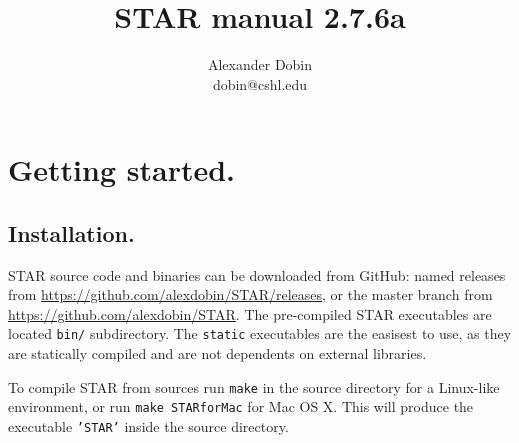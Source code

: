 \documentclass[12pt]{article}
\begin{document}
\hypersetup{
	linkcolor=MidnightBlue
	}


\newcommand{\optn}[1]{\sloppy\textcolor{violet}{\texttt{--#1}}}
\newcommand{\opt}[1]{\sloppy\hyperlink{#1}{\optn{#1}}}
\newcommand{\optv}[1]{\sloppy\texttt{#1}}
\newcommand{\optvr}[1]{\sloppy\textit{\texttt{#1}}}

\newcommand{\code}[1]{\sloppy\texttt{#1}}
	
\newcommand{\codelines}[1]{\begin{adjustwidth}{0.5in}{0in}
	\raggedright\texttt{#1}
	\end{adjustwidth}}

\newcommand{\ofilen}[1]{\sloppy\texttt{#1}}

\newcommand{\sechyperref}[1]{\hyperref[#1]{Section \ref{#1}. \nameref{#1}}}

\title{STAR manual 2.7.6a}
\author{Alexander Dobin\\
dobin@cshl.edu}
\maketitle
\tableofcontents

\newpage

\section{Getting started.}
\subsection{Installation.}

STAR source code and binaries can be downloaded from GitHub: named releases from \url{https://github.com/alexdobin/STAR/releases}, or the master branch from \url{https://github.com/alexdobin/STAR}. The pre-compiled STAR executables are  located \code{bin/} subdirectory. The \code{static} executables are the easisest to use, as they are statically compiled and are not dependents on external libraries. 

To compile STAR from sources run \code{make} in the source directory for a Linux-like environment, or run \code{make STARforMac} for Mac OS X. This will produce the executable \code{'STAR'} inside the source directory.
\end{document}
